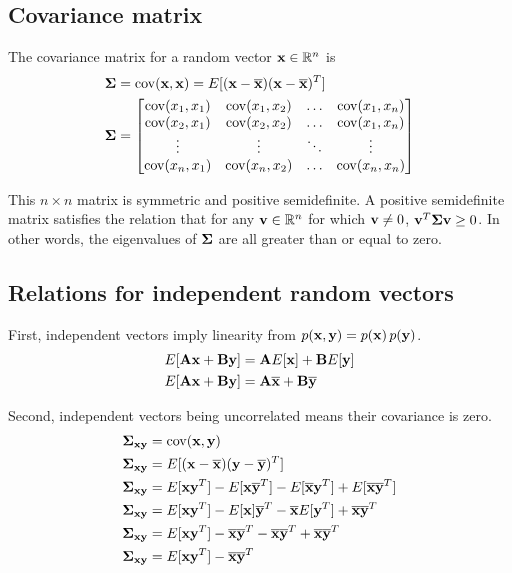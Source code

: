 \subsection{Covariance matrix}

The covariance matrix for a random vector $\mathbf{x} \in \mathbb{R}^n$ is
\begin{align*}
  \mathbf{\Sigma} &= \operatorname{cov}(\mathbf{x}, \mathbf{x}) = E[(\mathbf{x} - \overline{\mathbf{x}})
    (\mathbf{x} - \overline{\mathbf{x}})^T] \\
  \mathbf{\Sigma} &= \begin{bmatrix}
    \operatorname{cov}(x_1, x_1) & \operatorname{cov}(x_1, x_2) & \ldots & \operatorname{cov}(x_1, x_n) \\
    \operatorname{cov}(x_2, x_1) & \operatorname{cov}(x_2, x_2) & \ldots & \operatorname{cov}(x_1, x_n) \\
    \vdots         & \vdots         & \ddots & \vdots \\
    \operatorname{cov}(x_n, x_1) & \operatorname{cov}(x_n, x_2) & \ldots & \operatorname{cov}(x_n, x_n) \\
  \end{bmatrix}
\end{align*}

This $n \times n$ matrix is symmetric and positive semidefinite. A positive
semidefinite matrix satisfies the relation that for any
$\mathbf{v} \in \mathbb{R}^n$ for which $\mathbf{v} \neq 0$,
$\mathbf{v}^T \mathbf{\Sigma} \mathbf{v} \geq 0$. In other words, the eigenvalues of
$\mathbf{\Sigma}$ are all greater than or equal to zero.

\subsection{Relations for independent random vectors}

First, independent vectors imply linearity from
$p(\mathbf{x}, \mathbf{y}) = p(\mathbf{x}) \,p(\mathbf{y})$.
\begin{align*}
  E[\mathbf{A}\mathbf{x} + \mathbf{B}\mathbf{y}] &= \mathbf{A}E[\mathbf{x}] + \mathbf{B}E[\mathbf{y}] \\
  E[\mathbf{A}\mathbf{x} + \mathbf{B}\mathbf{y}] &= \mathbf{A}\overline{\mathbf{x}} + \mathbf{B}\overline{\mathbf{y}}
\end{align*}

Second, independent vectors being uncorrelated means their covariance is zero.
\begin{align}
  \mathbf{\Sigma}_{\mathbf{x}\mathbf{y}} &= \operatorname{cov}(\mathbf{x}, \mathbf{y}) \nonumber \\
  \mathbf{\Sigma}_{\mathbf{x}\mathbf{y}} &= E[(\mathbf{x} - \overline{\mathbf{x}})
    (\mathbf{y} - \overline{\mathbf{y}})^T] \nonumber \\
  \mathbf{\Sigma}_{\mathbf{x}\mathbf{y}} &= E[\mathbf{x}\mathbf{y}^T] -
    E[\mathbf{x}\overline{\mathbf{y}}^T] - E[\overline{\mathbf{x}}\mathbf{y}^T] +
    E[\overline{\mathbf{x}}\overline{\mathbf{y}}^T] \nonumber \\
  \mathbf{\Sigma}_{\mathbf{x}\mathbf{y}} &= E[\mathbf{x}\mathbf{y}^T] -
    E[\mathbf{x}]\overline{\mathbf{y}}^T - \overline{\mathbf{x}}E[\mathbf{y}^T] +
    \overline{\mathbf{x}}\overline{\mathbf{y}}^T \nonumber \\
  \mathbf{\Sigma}_{\mathbf{x}\mathbf{y}} &= E[\mathbf{x}\mathbf{y}^T] -
    \overline{\mathbf{x}}\overline{\mathbf{y}}^T - \overline{\mathbf{x}}\overline{\mathbf{y}}^T +
    \overline{\mathbf{x}}\overline{\mathbf{y}}^T \nonumber \\
  \mathbf{\Sigma}_{\mathbf{x}\mathbf{y}} &= E[\mathbf{x}\mathbf{y}^T] -
    \overline{\mathbf{x}}\overline{\mathbf{y}}^T \label{eq:prb_sigma}
\end{align}

